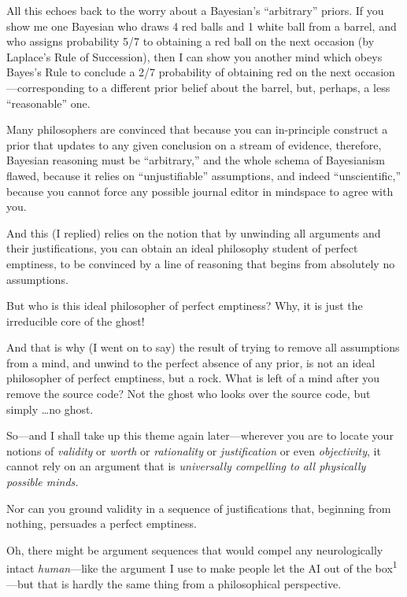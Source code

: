 {
 All this echoes back to the worry about a
Bayesian's
``arbitrary'' priors. If you show me
one Bayesian who draws 4 red balls and 1 white ball from a barrel, and
who assigns probability 5/7 to obtaining a red ball on the next
occasion (by Laplace's Rule of Succession), then I can
show you another mind which obeys Bayes's Rule to
conclude a 2/7 probability of obtaining red on the next
occasion---corresponding to a different prior belief about the barrel,
but, perhaps, a less ``reasonable''
one.}

{
 Many philosophers are convinced that because you can in-principle
construct a prior that updates to any given conclusion on a stream of
evidence, therefore, Bayesian reasoning must be
``arbitrary,'' and the whole schema
of Bayesianism flawed, because it relies on
``unjustifiable'' assumptions, and
indeed ``unscientific,'' because you
cannot force any possible journal editor in mindspace to agree with
you.}

{
 And this (I replied) relies on the notion that by unwinding all
arguments and their justifications, you can obtain an ideal philosophy
student of perfect emptiness, to be convinced by a line of reasoning
that begins from absolutely no assumptions.}

{
 But who is this ideal philosopher of perfect emptiness? Why, it is
just the irreducible core of the ghost!}

{
 And that is why (I went on to say) the result of trying to remove
all assumptions from a mind, and unwind to the perfect absence of any
prior, is not an ideal philosopher of perfect emptiness, but a rock.
What is left of a mind after you remove the source code? Not the ghost
who looks over the source code, but simply \ldots no ghost.}

{
 So---and I shall take up this theme again later---wherever you are
to locate your notions of \textit{validity} or \textit{worth} or
\textit{rationality} or \textit{justification} or even
\textit{objectivity}, it cannot rely on an argument that is
\textit{universally compelling to all physically possible minds.}}

{
 Nor can you ground validity in a sequence of justifications that,
beginning from nothing, persuades a perfect emptiness.}

{
 Oh, there might be argument sequences that would compel any
neurologically intact \textit{human}{}---like the argument I use to
make people let the AI out of the box\textsuperscript{1}{}---but that
is hardly the same thing from a philosophical perspective.}

